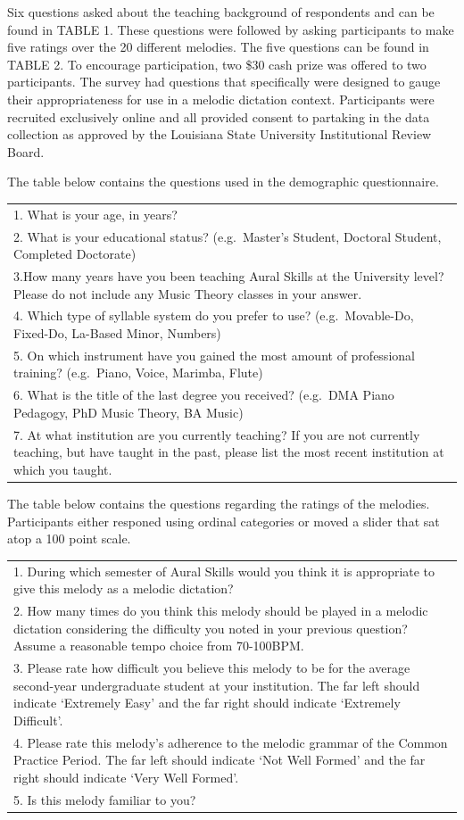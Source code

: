 \documentclass[]{book}
\begin{document}
Six questions asked about the teaching background of respondents and can be found in TABLE 1.
These questions were followed by asking participants to make five ratings over the 20 different melodies.
The five questions can be found in TABLE 2.
To encourage participation, two \$30 cash prize was offered to two participants.
The survey had questions that specifically were designed to gauge their appropriateness for use in a melodic dictation context.
Participants were recruited exclusively online and all provided consent to partaking in the data collection as approved by the Louisiana State University Institutional Review Board.

The table below contains the questions used in the demographic questionnaire.

\begin{longtable}[]{@{}l@{}}
\toprule
\endhead
1. What is your age, in years?\tabularnewline
2. What is your educational status? (e.g.~Master's Student, Doctoral Student, Completed Doctorate)\tabularnewline
3.How many years have you been teaching Aural Skills at the University level? Please do not include any Music Theory classes in your answer.\tabularnewline
4. Which type of syllable system do you prefer to use? (e.g.~Movable-Do, Fixed-Do, La-Based Minor, Numbers)\tabularnewline
5. On which instrument have you gained the most amount of professional training? (e.g.~Piano, Voice, Marimba, Flute)\tabularnewline
6. What is the title of the last degree you received? (e.g.~DMA Piano Pedagogy, PhD Music Theory, BA Music)\tabularnewline
7. At what institution are you currently teaching? If you are not currently teaching, but have taught in the past, please list the most recent institution at which you taught.\tabularnewline
\bottomrule
\end{longtable}

The table below contains the questions regarding the ratings of the melodies.
Participants either responed using ordinal categories or moved a slider that sat atop a 100 point scale.

\begin{longtable}[]{@{}l@{}}
\toprule
\endhead
1. During which semester of Aural Skills would you think it is appropriate to give this melody as a melodic dictation?\tabularnewline
2. How many times do you think this melody should be played in a melodic dictation considering the difficulty you noted in your previous question? Assume a reasonable tempo choice from 70-100BPM.\tabularnewline
3. Please rate how difficult you believe this melody to be for the average second-year undergraduate student at your institution. The far left should indicate `Extremely Easy' and the far right should indicate `Extremely Difficult'.\tabularnewline
4. Please rate this melody's adherence to the melodic grammar of the Common Practice Period. The far left should indicate `Not Well Formed' and the far right should indicate `Very Well Formed'.\tabularnewline
5. Is this melody familiar to you?\tabularnewline
\bottomrule
\end{longtable}
\end{document}
